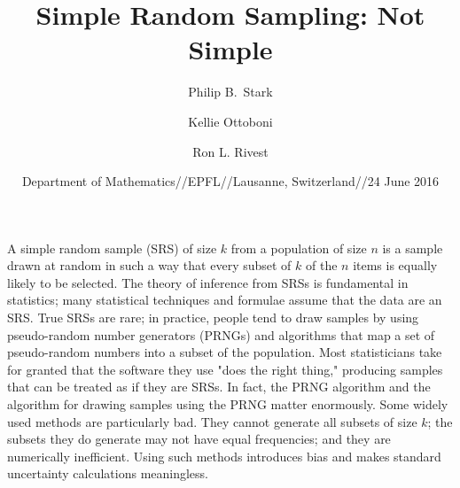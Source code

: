 \documentclass[fleqn]{beamer}
\theoremstyle{plain}
\begin{document}
\title[] %
{Simple Random Sampling: Not Simple}

\author{Philip B.~Stark}
\author{Kellie Ottoboni}
\author{Ron L. Rivest}


\date{Department of Mathematics//EPFL//Lausanne, Switzerland//24 June 2016}


\subject{Random Sampling}




\begin{frame}
  \titlepage
}

\end{frame}

\begin{frame}
  {\small A simple random sample (SRS) of size $k$ from a population of size $n$ is a sample drawn 
at random in such a way that every subset of $k$ of the $n$ items is equally likely to be selected. 
The theory of inference from SRSs is fundamental in statistics;
many statistical techniques and formulae assume that the data are an SRS.
True SRSs are rare; in practice, people tend to draw samples by using pseudo-random number generators 
(PRNGs) and algorithms that map a set of pseudo-random numbers into a subset of the population. 
Most statisticians take for granted that the software they use "does the right thing," 
producing samples that can be treated as if they are SRSs.
In fact, the PRNG algorithm and the algorithm for drawing samples using the PRNG matter
enormously.
Some widely used methods are particularly bad.
They cannot generate all subsets of size $k$; the subsets they do generate
may not have equal frequencies; and they are numerically inefficient.
Using such methods introduces bias and makes standard uncertainty calculations meaningless.
}
\end{frame}
\end{document}

